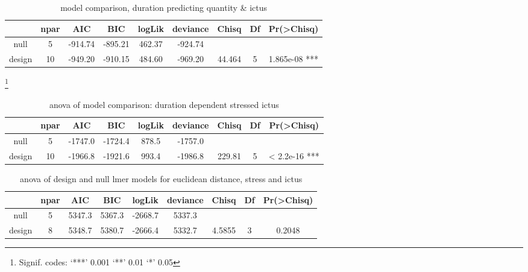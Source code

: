 
\begin{table}[htb]
\caption{model comparison, duration predicting quantity \& ictus}
\centering
\begin{tabular}{|ccccccccc|}
\hline
      & npar   &  AIC   &  BIC & logLik & deviance  & Chisq & Df & Pr(>Chisq)    \\
      \hline
null  &  5 &-914.74 &-895.21 &462.37  &-924.74        &&& \\                 
design  &  10 &-949.20 &-910.15 &484.60 & -969.20 & 44.464  &5  &1.865e-08 *** \\
\hline

\end{tabular}
\label{qcomp}
\end{table}%
 \footnote{Signif. codes:   ‘***’ 0.001 ‘**’ 0.01 ‘*’ 0.05 }



\begin{table}[htp]
\caption{anova of model comparison: duration dependent stressed ictus}
\begin{center}
\centering
\begin{tabular}{|ccccccccc|}
\hline
      & npar   &  AIC   &  BIC & logLik & deviance  & Chisq & Df & Pr(>Chisq)    \\
\hline
null &   5& -1747.0 &-1724.4  &878.5 & -1757.0         && \\       
\hline         
design &   10& -1966.8& -1921.6  &993.4  &-1986.8 & 229.81&  5 & < 2.2e-16 ***\\
\hline

\end{tabular}
\end{center}
\label{durstrickmdls}
\end{table}%

%
%



\begin{table}[htp]
\caption{anova of design and null lmer models for euclidean distance, stress and ictus }
\begin{center}
\centering
\begin{tabular}{|ccccccccc|}

\hline
     &       npar  &  AIC   & BIC  & logLik & deviance  & Chisq & Df & Pr(>Chisq) \\
     \hline
null  &  5 & 5347.3 & 5367.3 & -2668.7  & 5337.3             \\        
design    &      8 & 5348.7& 5380.7 &-2666.4  & 5332.7 & 4.5855 & 3   &  0.2048 \\
\hline
\end{tabular}
\end{center}
\label{aoveuc}
\end{table}%


